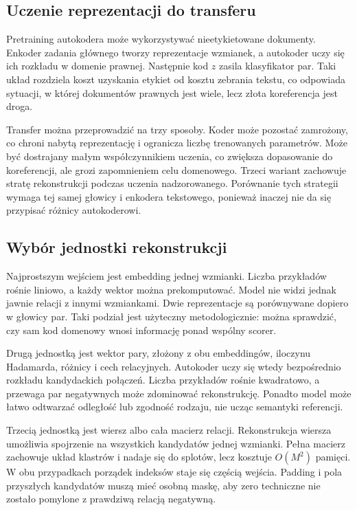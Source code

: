 \subsection{Uczenie reprezentacji do transferu}

Pretraining autokodera może wykorzystywać nieetykietowane dokumenty. Enkoder zadania głównego tworzy reprezentacje wzmianek, a autokoder uczy się ich rozkładu w domenie prawnej. Następnie kod $z$ zasila klasyfikator par. Taki układ rozdziela koszt uzyskania etykiet od kosztu zebrania tekstu, co odpowiada sytuacji, w której dokumentów prawnych jest wiele, lecz złota koreferencja jest droga.

Transfer można przeprowadzić na trzy sposoby. Koder może pozostać zamrożony, co chroni nabytą reprezentację i ogranicza liczbę trenowanych parametrów. Może być dostrajany małym współczynnikiem uczenia, co zwiększa dopasowanie do koreferencji, ale grozi zapomnieniem celu domenowego. Trzeci wariant zachowuje stratę rekonstrukcji podczas uczenia nadzorowanego. Porównanie tych strategii wymaga tej samej głowicy i enkodera tekstowego, ponieważ inaczej nie da się przypisać różnicy autokoderowi.

\subsection{Wybór jednostki rekonstrukcji}

Najprostszym wejściem jest embedding jednej wzmianki. Liczba przykładów rośnie liniowo, a każdy wektor można prekomputować. Model nie widzi jednak jawnie relacji z innymi wzmiankami. Dwie reprezentacje są porównywane dopiero w głowicy par. Taki podział jest użyteczny metodologicznie: można sprawdzić, czy sam kod domenowy wnosi informację ponad wspólny scorer.

Drugą jednostką jest wektor pary, złożony z obu embeddingów, iloczynu Hadamarda, różnicy i cech relacyjnych. Autokoder uczy się wtedy bezpośrednio rozkładu kandydackich połączeń. Liczba przykładów rośnie kwadratowo, a przewaga par negatywnych może zdominować rekonstrukcję. Ponadto model może łatwo odtwarzać odległość lub zgodność rodzaju, nie ucząc semantyki referencji.

Trzecią jednostką jest wiersz albo cała macierz relacji. Rekonstrukcja wiersza umożliwia spojrzenie na wszystkich kandydatów jednej wzmianki. Pełna macierz zachowuje układ klastrów i nadaje się do splotów, lecz kosztuje $O(M^2)$ pamięci. W obu przypadkach porządek indeksów staje się częścią wejścia. Padding i pola przyszłych kandydatów muszą mieć osobną maskę, aby zero techniczne nie zostało pomylone z prawdziwą relacją negatywną.

